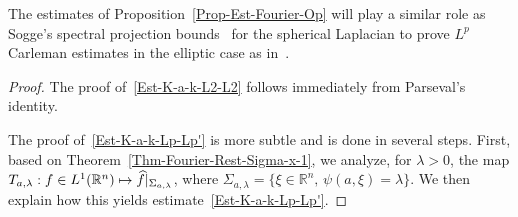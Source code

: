 \documentclass[AHL,Unicode,longabstracts]{cedram}
\newcommand*\R{\mathbb{R}}
\renewcommand{\hat}{\widehat}
\let\oldhat\hat
\renewcommand*{\hat}[1]{\mathchoice{\widehat{#1}}{\widehat{#1}}{\oldhat{#1}}{\oldhat{#1}}}
\begin{document}
\begin{rema}
The estimates of Proposition~\ref{Prop-Est-Fourier-Op} will play a similar role as Sogge's spectral projection bounds~\cite{sogge1988concerning} for the spherical Laplacian to prove $L^p$ Carleman estimates in the elliptic case as in~\cite{jerison1986carleman, Sogge.Strong.Elliptic1990,koch2001carleman}.
\end{rema}

\begin{proof}
The proof of~\eqref{Est-K-a-k-L2-L2} follows immediately from Parseval's identity.

The proof of~\eqref{Est-K-a-k-Lp-Lp'} is more subtle and is done in several steps. First, based on Theorem~\ref{Thm-Fourier-Rest-Sigma-x-1}, we analyze, for $\lambda>0$, the map $T_{a,\lambda}: f \in L^1(\R^n) \mapsto \hat f|_{\Sigma_{a,\lambda}}$, where $\Sigma_{a,\lambda} = \{ \xi \in \R^n, \, \psi(a, \xi) = \lambda\}$. We then explain how this yields estimate~\eqref{Est-K-a-k-Lp-Lp'}.


\end{proof}
\end{document}

